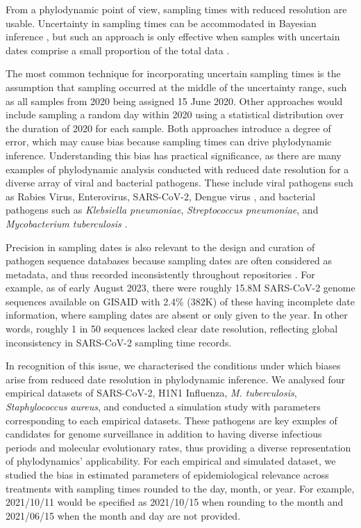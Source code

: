 \documentclass[12pt]{article}
\begin{document}
\begin{spacing}{2}
From a phylodynamic point of view, sampling times with reduced resolution are usable. Uncertainty in sampling times can be accommodated in Bayesian inference \citep{shapiro2011bayesian}, but such an approach is only effective when samples with uncertain dates comprise a small proportion of the total data \citep{rieux2017tipdatingbeast}.

The most common technique for incorporating uncertain sampling times is the assumption that sampling occurred at the middle of the uncertainty range, such as all samples from 2020 being assigned 15 June 2020. Other approaches would include sampling a random day within 2020 using a statistical distribution over the duration of 2020 for each sample. Both approaches introduce a degree of error, which may cause bias because sampling times can drive phylodynamic inference\citep{featherstone_decoding_2023,featherstone_infectious_2021,volz_sampling_2014}. Understanding this bias has practical significance, as there are many examples of phylodynamic analysis conducted with reduced date resolution for a diverse array of viral and bacterial pathogens. These include viral pathogens such as Rabies Virus, Enterovirus, SARS-CoV-2, Dengue virus \citep{talbi_phylodynamics_2010,xiao_genomic_2022,wolf_temporal_2022,bennett_epidemic_2010}, and bacterial pathogens such as \textit{Klebsiella pneumoniae}, \textit{Streptococcus pneumoniae}, and \textit{Mycobacterium tuberculosis} \citep{cella_multi-drug_2017,azarian_impact_2018,merker_evolutionary_2015}. 

Precision in sampling dates is also relevant to the design and curation of pathogen sequence databases because sampling dates are often considered as metadata, and thus recorded inconsistently throughout repositories \citep{raza2016big}. For example, as of early August 2023, there were roughly 15.8M SARS-CoV-2 genome sequences available on GISAID with 2.4\% (382K) of these having incomplete date information, where sampling dates are absent or only given to the year. In other words, roughly 1 in 50 sequences lacked clear date resolution, reflecting global inconsistency in SARS-CoV-2 sampling time records.

In recognition of this issue, we characterised the conditions under which biases arise from reduced date resolution in phylodynamic inference. We analysed four empirical datasets of SARS-CoV-2, H1N1 Influenza, \textit{M. tuberculosis}, \textit{Staphylococcus aureus}, and conducted a simulation study with parameters corresponding to each empirical datasets. These pathogens are key exmples of candidates for genome surveillance in addition to having diverse infectious periods and molecular evolutionary rates, thus providing a diverse representation of phylodynamics' applicability. For each empirical and simulated dataset, we studied the bias in estimated parameters of epidemiological relevance across treatments with sampling times rounded to the day, month, or year. For example, 2021/10/11 would be specified as 2021/10/15 when rounding to the month and 2021/06/15 when the month and day are not provided.


\end{spacing}
\end{document}
